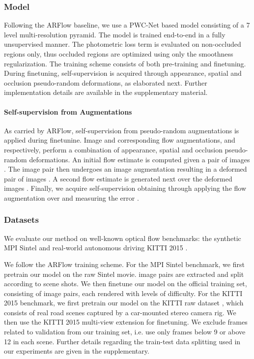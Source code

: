 \documentclass[10pt,twocolumn,letterpaper]{article}
\begin{document}
\subsubsection{Model}
Following the ARFlow \cite{liu2020learning} baseline, we use a PWC-Net based model consisting of a 7 level multi-resolution pyramid. The model is trained end-to-end in a fully unsupervised manner. The photometric loss term is evaluated on non-occluded regions only, thus occluded regions are optimized using only the smoothness regularization. The training scheme consists of both pre-training and finetuning. During finetuning, self-supervision is acquired through appearance, spatial and occlusion pseudo-random deformations, as elaborated next. Further implementation details are available in the supplementary material.

\paragraph{Self-supervision from Augmentations}
As carried by ARFlow, self-supervision from pseudo-random augmentations is applied during finetunine. Image and corresponding flow augmentations,  and  respectively, perform a combination of appearance, spatial and occlusion pseudo-random deformations. An initial flow estimate  is computed given a pair of images . The image pair then undergoes an image augmentation  resulting in a deformed pair of images . A second flow estimate  is generated next over the deformed images . Finally, we acquire self-supervision obtaining  through applying the flow augmentation  over  and measuring the error .








\subsubsection{Datasets} \label{datasets}
We evaluate our method on well-known optical flow benchmarks: the synthetic MPI Sintel \cite{Butler:ECCV:2012} and real-world autonomous driving KITTI 2015 \cite{Menze2015CVPR}. 

We follow the ARFlow \cite{liu2020learning} training scheme. For the MPI Sintel benchmark, we first pretrain our model on the raw Sintel movie.  image pairs are extracted and split according to scene shots. We then finetune our model on the official training set, consisting of  image pairs, each rendered with  levels of difficulty. 
For the KITTI 2015 benchmark, we first pretrain our model on the KITTI raw dataset \cite{Geiger2013IJRR}, which consists of real road scenes captured by a car-mounted stereo camera rig. 
We then use the KITTI 2015 multi-view extension for finetuning. We exclude frames related to validation from our training set, i.e. use only frames below 9 or above 12 in each scene. Further details regarding the train-test data splitting used in our experiments are given in the supplementary.
\end{document}
